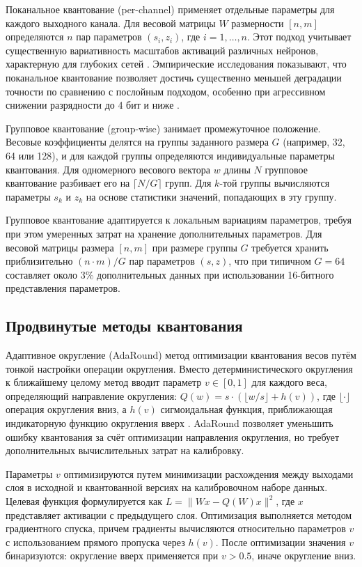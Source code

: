 \documentclass[bachelor, och, coursework]{SCWorks}
\begin{document}
	Поканальное квантование (per-channel) применяет отдельные параметры для каждого выходного канала. Для весовой матрицы \(W\) размерности \([n, m]\) определяются \(n\) пар параметров \((s_i, z_i)\), где \(i = 1, \dots, n\). Этот подход учитывает существенную вариативность масштабов активаций различных нейронов, характерную для глубоких сетей \cite{microscaling}. Эмпирические исследования показывают, что поканальное квантование позволяет достичь существенно меньшей деградации точности по сравнению с послойным подходом, особенно при агрессивном снижении разрядности до 4 бит и ниже \cite{gptq}.
	
	Групповое квантование (group-wise) занимает промежуточное положение. Весовые коэффициенты делятся на группы заданного размера \(G\) (например, 32, 64 или 128), и для каждой группы определяются индивидуальные параметры квантования. Для одномерного весового вектора \(w\) длины \(N\) групповое квантование разбивает его на \(\lceil N / G \rceil\) групп. Для \(k\)-той группы вычисляются параметры \(s_k\) и \(z_k\) на основе статистики значений, попадающих в эту группу.
	
	Групповое квантование адаптируется к локальным вариациям параметров, требуя при этом умеренных затрат на хранение дополнительных параметров. Для весовой матрицы размера \([n, m]\) при размере группы \(G\) требуется хранить приблизительно \((n \cdot m) / G\) пар параметров \((s, z)\), что при типичном \(G = 64\) составляет около 3\% дополнительных данных при использовании 16-битного представления параметров.
	
	\subsection{Продвинутые методы квантования}
	
	Адаптивное округление (AdaRound) метод оптимизации квантования весов путём тонкой настройки операции округления. Вместо детерминистического округления к ближайшему целому метод вводит параметр \(v \in [0, 1]\) для каждого веса, определяющий направление округления: \(Q(w) = s \cdot (\lfloor w / s \rfloor + h(v))\), где \(\lfloor \cdot \rfloor\) операция округления вниз, а \(h(v)\) сигмоидальная функция, приближающая индикаторную функцию округления вверх \cite{sparsegpt}. AdaRound позволяет уменьшить ошибку квантования за счёт оптимизации направления округления, но требует дополнительных вычислительных затрат на калибровку.
	
	Параметры \(v\) оптимизируются путем минимизации расхождения между выходами слоя в исходной и квантованной версиях на калибровочном наборе данных. Целевая функция формулируется как \(L = \|Wx - Q(W)x\|^{2}\), где \(x\) представляет активации с предыдущего слоя. Оптимизация выполняется методом градиентного спуска, причем градиенты вычисляются относительно параметров \(v\) с использованием прямого пропуска через \(h(v)\). После оптимизации значения \(v\) бинаризуются: округление вверх применяется при \(v > 0.5\), иначе округление вниз.
	
\end{document}
